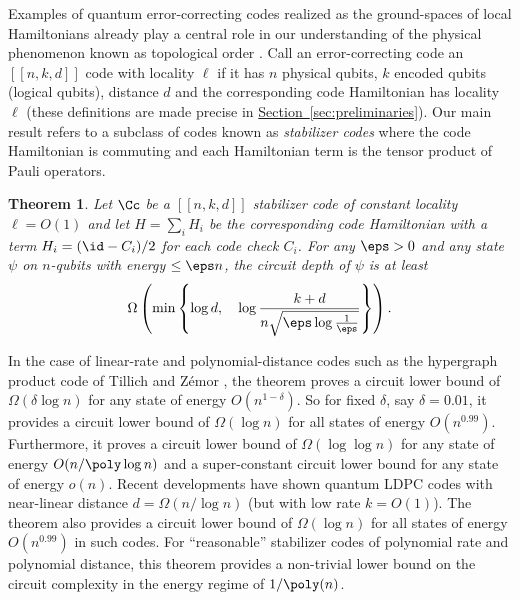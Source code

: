 \documentclass[11pt]{article}
\newcommand{\expref}[2]{\texorpdfstring{\hyperref[#2]{#1~\ref{#2}}}{#1~\ref{#2}}}
\newtheorem{theorem}{Theorem}[section]
\begin{document}
Examples of quantum error-correcting codes realized as the ground-spaces of local Hamiltonians already play a central role in our understanding of the physical phenomenon known as topological order \cite{KITAEV20032,PhysRevLett.107.210501}. 
%
Call an error-correcting code an $[[n,k,d]]$ code with locality $\ell$ if it has $n$ physical qubits, %
$k$ encoded qubits (logical qubits), %
distance $d$ and the corresponding code Hamiltonian has locality $\ell$ (these definitions are made precise in \expref{Section}{sec:preliminaries}).
%
Our main result refers to a subclass of codes known as \emph{stabilizer codes} where the code Hamiltonian is commuting and each Hamiltonian term is the tensor product of Pauli operators.

\begin{theorem}
\label{thm:main}
Let $\Cc$ be a $[[n,k,d]]$ stabilizer code of constant locality $\ell=O(1)$ and let $H=\sum_i H_i$ be the corresponding code Hamiltonian with a term $H_i = (\id - C_i)/2$ for each code check $C_i$. For any $\eps>0$ and any state $\psi$ on $n$-qubits with energy $\leq\eps n$, the circuit depth of $\psi$ is at least
\begin{align}
    \Omega \left( \min \left\{ \log d, \quad \log {\frac{k + d}{n\sqrt{\eps \log\frac{1}{\eps}}}} \right\} \right).
\end{align}
\end{theorem}

In the case of linear-rate and polynomial-distance codes such as the hypergraph product code of Tillich and Z\'emor \cite{5205648}, the theorem proves a circuit lower bound of $\Omega(\delta \log n)$ for any state of energy $O(n^{1-\delta})$. So for fixed $\delta$, say $\delta = 0.01$, it provides a circuit lower bound of $\Omega(\log n)$ for all states of energy $O(n^{0.99})$. Furthermore, it proves a circuit lower bound of $\Omega(\log \log n)$ for any state of energy $O(n/\poly \log n)$ and a super-constant circuit lower bound for any state of energy $o(n)$. {Recent developments \cite{panteleev2020quantum, hastings2020fiber,Breuckmann2020BalancedPQ} have shown quantum LDPC codes with near-linear distance $d=\Omega(n/\log n)$  (but with low rate $k=O(1)$). The theorem also provides a circuit lower bound of $\Omega(\log n)$ for all states of energy $O(n^{0.99})$ in such codes.}
For ``reasonable'' stabilizer codes of polynomial rate and polynomial distance, this theorem provides a non-trivial lower bound on the circuit complexity in the energy regime of $1/\poly(n)$. 
\end{document}
